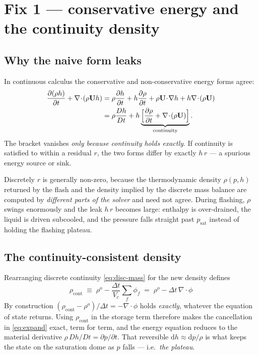 \documentclass[11pt,a4paper]{article}
\newcommand{\uvec}{\mathbf{U}}
\newcommand{\dt}{\Delta t}
\newcommand{\rhocont}{\rho_{\mathrm{cont}}}
\begin{document}
\section{Fix 1 --- conservative energy and the continuity density}\label{sec:rhocont}

\subsection{Why the naive form leaks}

In continuous calculus the conservative and non-conservative energy forms agree:
\begin{align}
  \frac{\partial(\rho h)}{\partial t} + \nabla\!\cdot\!(\rho\uvec h)
  &= \rho\frac{\partial h}{\partial t} + h\frac{\partial \rho}{\partial t}
   + \rho\uvec\!\cdot\!\nabla h + h\nabla\!\cdot\!(\rho\uvec) \notag\\
  &= \rho \frac{Dh}{Dt}
   + h\underbrace{\Big[\frac{\partial \rho}{\partial t} + \nabla\!\cdot\!(\rho\uvec)\Big]}_{\text{continuity}} .
  \label{eq:expand}
\end{align}
The bracket vanishes \emph{only because continuity holds exactly}. If continuity
is satisfied to within a residual $r$, the two forms differ by exactly $h\,r$ ---
a spurious energy source or sink.

Discretely $r$ is generally non-zero, because the thermodynamic density
$\rho(p,h)$ returned by the flash and the density implied by the discrete mass
balance are computed by \emph{different parts of the solver} and need not agree.
During flashing, $\rho$ swings enormously and the leak $h\,r$ becomes large:
enthalpy is over-drained, the liquid is driven subcooled, and the pressure falls
straight past $p_{\mathrm{sat}}$ instead of holding the flashing plateau.

\subsection{The continuity-consistent density}

Rearranging discrete continuity \eqref{eq:disc-mass} for the new density defines
\begin{equation}
  \boxed{\;\rhocont \;\equiv\; \rho^{o} - \frac{\dt}{V_c}\sum_f \phi_f
  \;=\; \rho^{o} - \dt\,\nabla\!\cdot\!\phi \;}
  \label{eq:rhocont}
\end{equation}
By construction $(\rhocont - \rho^{o})/\dt = -\nabla\!\cdot\!\phi$ holds
\emph{exactly}, whatever the equation of state returns. Using $\rhocont$ in the
storage term therefore makes the cancellation in \eqref{eq:expand} exact,
term for term, and the energy equation reduces to the material derivative
$\rho\,Dh/Dt = \partial p/\partial t$. That reversible $\mathrm{d}h \approx
\mathrm{d}p/\rho$ is what keeps the state on the saturation dome as $p$ falls ---
i.e.\ \emph{the plateau}.
\end{document}
